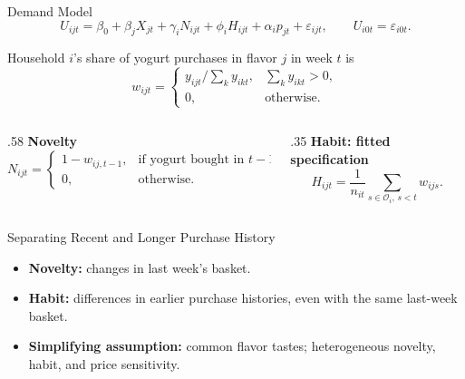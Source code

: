 \documentclass[aspectratio=169,professionalfonts]{beamer}
\newcommand{\shortbuttons}{}
\begin{document}
\gdef\shortbuttons{\hyperlink{short-average-history}{\beamergotobutton{Average-history specification}}}
\begin{frame}[label=short-27]{Demand Model}
  \footnotesize
  \[
    U_{ijt}=\beta_0+\beta_jX_{jt}+\gamma_iN_{ijt}+\phi_iH_{ijt}
             +\alpha_i p_{jt}+\varepsilon_{ijt},
    \qquad U_{i0t}=\varepsilon_{i0t}.
  \]

  Household $i$'s share of yogurt purchases in flavor $j$ in week $t$ is
  \[
    w_{ijt}=\begin{cases}y_{ijt}/\sum_k y_{ikt},&\sum_k y_{ikt}>0,\\0,&\text{otherwise}.\end{cases}
  \]

  \begin{columns}[T,onlytextwidth]
    \begin{column}{.58\textwidth}
      \textbf{Novelty}
      \[
        N_{ijt}=\begin{cases}
          1-w_{ij,t-1}, & \text{if yogurt bought in $t-1$},\\
          0, & \text{otherwise}.
        \end{cases}
      \]
    \end{column}
    \begin{column}{.35\textwidth}
      \textbf{Habit: fitted specification}
      \[
        H_{ijt}=\frac{1}{n_{it}}\sum_{s\in\mathcal O_i,\,s<t}w_{ijs}.
      \]
    \end{column}
  \end{columns}
\end{frame}

\gdef\shortbuttons{}
\begin{frame}[label=short-identification]{Separating Recent and Longer Purchase History}
  \begin{itemize}
    \item \textbf{Novelty:} changes in last week's basket.
    \item \textbf{Habit:} differences in earlier purchase histories, even with the same last-week basket.
    \item \textbf{Simplifying assumption:} common flavor tastes; heterogeneous novelty, habit, and price sensitivity.
  \end{itemize}
\end{frame}
\end{document}
